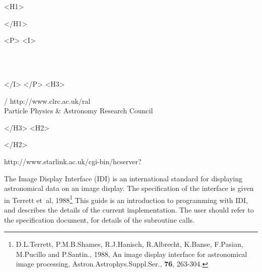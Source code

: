 \begin{htmlonly}
   \xlabel{}
   \begin{rawhtml} <H1> \end{rawhtml}
      \stardoctitle
   \begin{rawhtml} </H1> \end{rawhtml}


   \begin{rawhtml} <P> <I> \end{rawhtml}
   \stardoccategory\ \stardocnumber \\
   \stardocauthors \\
   \stardocdate
   \begin{rawhtml} </I> </P> <H3> \end{rawhtml}
       /
                        {http://www.clrc.ac.uk/ral} \\
      Particle Physics \& Astronomy Research Council \\
   \begin{rawhtml} </H3> <H2> \end{rawhtml}
   \begin{rawhtml} </H2> \end{rawhtml}
      {http://www.starlink.ac.uk/cgi-bin/hcserver?\stardocsource}\\


\end{htmlonly}


The Image Display Interface (IDI) is an international standard for
displaying astronomical data on an image display. 
The specification of the interface is given in Terrett et~al, 
1988\footnote{D.L.Terrett, P.M.B.Shames, R.J.Hanisch, R.Albrecht,
K.Banse, F.Pasian, M.Pucillo and P.Santin., 1988, 
An image display interface for astronomical image processing, 
Astron.Astrophys.Suppl.Ser., {\bf 76}, 263-304.}
This guide is an introduction to
programming with IDI, and describes the details of the current implementation.
The user should refer to the specification document, for details of the
subroutine calls.

